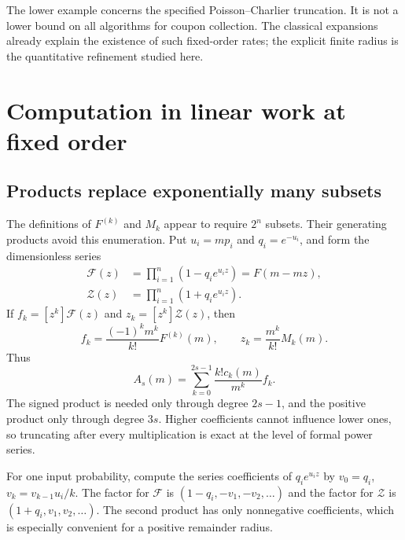 \documentclass[11pt,a4paper]{article}
\theoremstyle{definition}
\begin{document}
The lower example concerns the specified Poisson--Charlier truncation.
It is not a lower bound on all algorithms for coupon collection. The
classical expansions already explain the existence of such fixed-order
rates; the explicit finite radius is the quantitative refinement studied
here.

\section{Computation in linear work at fixed order}\label{sec:algorithm}

\subsection{Products replace exponentially many subsets}

The definitions of $F^{(k)}$ and $M_k$ appear to require $2^n$ subsets.
Their generating products avoid this enumeration. Put $u_i=mp_i$ and
$q_i=e^{-u_i}$, and form the dimensionless series
\begin{align}
 \mathscr F(z)&=\prod_{i=1}^n(1-q_i e^{u_i z})
               =F(m-mz),\label{eq:Fjet}\\
 \mathscr Z(z)&=\prod_{i=1}^n(1+q_i e^{u_i z}).
               \label{eq:Zjet}
\end{align}
If $f_k=[z^k]\mathscr F(z)$ and $z_k=[z^k]\mathscr Z(z)$, then
\begin{equation}\label{eq:jetconversion}
 f_k=\frac{(-1)^k m^k}{k!}F^{(k)}(m),\qquad
 z_k=\frac{m^k}{k!}M_k(m).
\end{equation}
Thus
\begin{equation}\label{eq:jetapprox}
 A_s(m)=\sum_{k=0}^{2s-1}
              \frac{k!c_k(m)}{m^k}f_k.
\end{equation}
The signed product is needed only through degree $2s-1$, and the
positive product only through degree $3s$. Higher coefficients cannot
influence lower ones, so truncating after every multiplication is exact
at the level of formal power series.

For one input probability, compute the series coefficients of
$q_i e^{u_i z}$ by $v_0=q_i$, $v_k=v_{k-1}u_i/k$. The factor for
$\mathscr F$ is $(1-q_i,-v_1,-v_2,\ldots)$ and the factor for
$\mathscr Z$ is $(1+q_i,v_1,v_2,\ldots)$. The second product has only
nonnegative coefficients, which is especially convenient for a positive
remainder radius.
\end{document}
